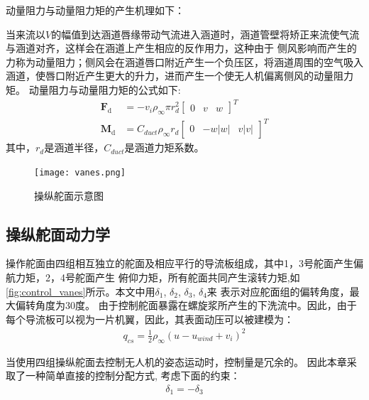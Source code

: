 动量阻力与动量阻力矩的产生机理如下：

当来流以$V$的幅值到达涵道唇缘带动气流进入涵道时，涵道管壁将矫正来流使气流与涵道对齐，这样会在涵道上产生相应的反作用力，这种由于
侧风影响而产生的力称为动量阻力；侧风会在涵道唇口附近产生一个负压区，将涵道周围的空气吸入涵道，使唇口附近产生更大的升力，进而产生一个使无人机偏离侧风的动量阻力矩。
动量阻力与动量阻力矩的公式如下\cite{argyle2013vertical}:
\begin{align}
    \mathbf{F}_{\text {d}} & = -v_{i} \rho_{\infty} \pi r_{d}^{2}\left[\begin{array}{lll}
    0 & v & w
    \end{array}\right]^{T}\\
    \mathbf{M}_{\text {d}} & = C_{d u c t} \rho_{\infty} r_{d}\left[\begin{array}{lll}
    0 & -w|w| & v|v|
    \end{array}\right]^{T}
\end{align}
其中，$r_{d}$是涵道半径，$C_{duct}$是涵道力矩系数。
\begin{figure}[htbp]
    \centering
    \texttt{[image: vanes.png]}
    \caption{\label{fig:control_vanes}操纵舵面示意图}
\end{figure}
\subsection{操纵舵面动力学}
操作舵面由四组相互独立的舵面及相应平行的导流板组成，其中1，3号舵面产生偏航力矩，2，4号舵面产生
俯仰力矩，所有舵面共同产生滚转力矩,如\autoref{fig:control_vanes}所示。本文中用$\delta_{1}$, $\delta_{2}$, $\delta_{3}$, $\delta_{4}$来
表示对应舵面组的偏转角度，最大偏转角度为30度。
由于控制舵面暴露在螺旋浆所产生的下洗流中。因此，由于每个导流板可以视为一片机翼，因此，其表面动压可以被建模为：
\begin{align}
    q_{cs}=\frac{1}{2} \rho_{\infty}\left(u-u_{wind}+v_{i}\right)^{2}
\end{align}

当使用四组操纵舵面去控制无人机的姿态运动时，控制量是冗余的。
因此本章采取了一种简单直接的控制分配方式\cite{zhang2013new}, 考虑下面的约束：
\begin{align}
    \delta_{1} = -\delta_{3}
\end{align}

